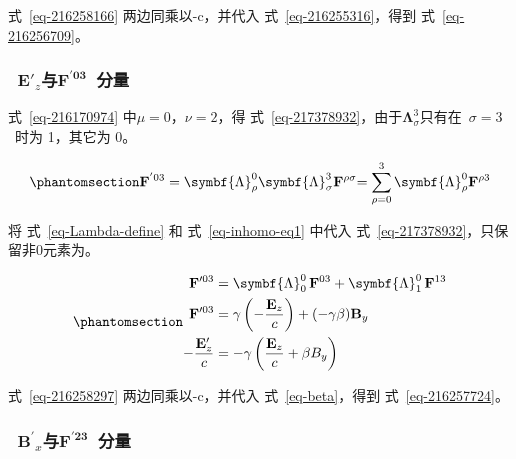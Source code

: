 \documentclass[
  chinese,
  a4paper,
  UTF8,
  12pt,
  oneside,
  openany]{ctexbook}
\begin{document}
式~\ref{eq-216258166} 两边同乘以-c，并代入 式~\ref{eq-216255316}，得到
式~\ref{eq-216256709}。

\subsubsection{\texorpdfstring{~\({\mathbf{E}'}_{z}\)与\(\mathbf{F}^{\mathbf{'03}}\)~分量}{~\{\textbackslash mathbf\{E\}\textquotesingle\}\_\{z\}与\textbackslash mathbf\{F\}\^{}\{\textbackslash mathbf\{\}\}~分量}}\label{mathbfe_zux4e0emathbffmathbf03-ux5206ux91cf}

式~\ref{eq-216170974} 中\(\mu = 0\)，\(\nu = 2\)，得
式~\ref{eq-217378932}，由于\(\symbf{\Lambda}_{\sigma}^{3}\)只有在~\(\sigma = 3\)~时为
1，其它为 0。

\begin{equation}\protect\phantomsection\label{eq-217378932}{
{\mathbf{F}^{'03} = \symbf{\Lambda}_{\rho}^{0}\symbf{\Lambda}_{\sigma}^{3}\mathbf{F}^{\rho\sigma}
  }{= \sum_{\rho = 0}^{3}{\symbf{\Lambda}_{\rho}^{0}\mathbf{F}^{\rho 3}}}
}\end{equation}

将 式~\ref{eq-Lambda-define} 和 式~\ref{eq-inhomo-eq1} 中代入
式~\ref{eq-217378932}，只保留非0元素为。

\begin{equation}\protect\phantomsection\label{eq-216258297}{
\begin{aligned}
\mathbf{F}'^{03}
&= \symbf{\Lambda}_{0}^{0}\,\mathbf{F}^{03} + \symbf{\Lambda}_{1}^{0}\,\mathbf{F}^{13} \\
\mathbf{F}'^{03}
&= \gamma\left(-\frac{\mathbf{E}_{z}}{c}\right) + (-\gamma\beta)\mathbf{B}_{y} \\
-\frac{\mathbf{E}'_{z}}{c}
&= -\gamma\left( \frac{\mathbf{E}_{z}}{c} + \beta B_{y} \right)
\end{aligned}
}\end{equation}

式~\ref{eq-216258297} 两边同乘以-c，并代入 式~\ref{eq-beta}，得到
式~\ref{eq-216257724}。

\subsubsection{\texorpdfstring{~\({\mathbf{B}^{\mathbf{'}}}_{x}\)与\(\mathbf{F}^{\mathbf{'23}}\)~分量}{~\{\textbackslash mathbf\{B\}\^{}\{\textbackslash mathbf\{\textquotesingle\}\}\}\_\{x\}与\textbackslash mathbf\{F\}\^{}\{\textbackslash mathbf\{\}\}~分量}}\label{mathbfbmathbf_xux4e0emathbffmathbf23-ux5206ux91cf}
\end{document}
